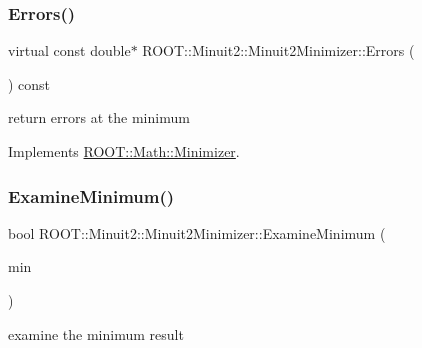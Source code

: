\subsubsection{\texorpdfstring{Errors()}{Errors()}\hspace{0.1cm}{\footnotesize\ttfamily [2/2]}}
{\footnotesize\ttfamily virtual const double$\ast$ R\+O\+O\+T\+::\+Minuit2\+::\+Minuit2\+Minimizer\+::\+Errors (\begin{DoxyParamCaption}{ }\end{DoxyParamCaption}) const\hspace{0.3cm}{\ttfamily [virtual]}}



return errors at the minimum 



Implements \mbox{\hyperlink{classROOT_1_1Math_1_1Minimizer_a42f71e22f16cf4c59b621cf7e1e75f3d}{R\+O\+O\+T\+::\+Math\+::\+Minimizer}}.

\mbox{\label{classROOT_1_1Minuit2_1_1Minuit2Minimizer_a004057cf512dcbd986799fabe756cecc}} 
\subsubsection{\texorpdfstring{ExamineMinimum()}{ExamineMinimum()}\hspace{0.1cm}{\footnotesize\ttfamily [1/2]}}
{\footnotesize\ttfamily bool R\+O\+O\+T\+::\+Minuit2\+::\+Minuit2\+Minimizer\+::\+Examine\+Minimum (\begin{DoxyParamCaption}\item[{const \mbox{\hyperlink{classROOT_1_1Minuit2_1_1FunctionMinimum}{R\+O\+O\+T\+::\+Minuit2\+::\+Function\+Minimum}} \&}]{min }\end{DoxyParamCaption})\hspace{0.3cm}{\ttfamily [protected]}}



examine the minimum result 

\mbox{\label{classROOT_1_1Minuit2_1_1Minuit2Minimizer_a004057cf512dcbd986799fabe756cecc}} 
